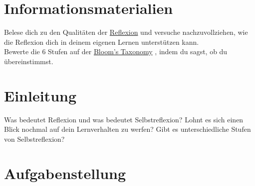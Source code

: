 \documentclass[a4paper,oneside]{scrarticle}
\begin{document}
	\pagebreak 
	
	\section*{Informationsmaterialien}
	
	Belese dich zu den Qualitäten der \href{https://doi.org/10.1007/s40692-020-00157-6}{Reflexion}\cite{sultana_e-portfolios_2020} und versuche nachzuvollziehen, wie die Reflexion dich in deinem eigenen Lernen unterstützen kann.\\
	Bewerte die 6 Stufen auf der 	\href{https://sci-hub.ru/https://www.tandfonline.com/doi/epdf/10.1207/s15430421tip4104_2?needAccess=true}{Bloom's Taxonomy} \cite{krathwohl_revision_2002}, indem du sagst, ob du übereinstimmst.
	
	
	
	
	
	\pagebreak
	
	\section*{Einleitung}
	Was bedeutet Reflexion und was bedeutet Selbstreflexion? Lohnt es sich einen Blick nochmal auf dein Lernverhalten zu werfen? Gibt es unterschiedliche Stufen von Selbstreflexion?
	
	\section*{Aufgabenstellung}
\end{document}
